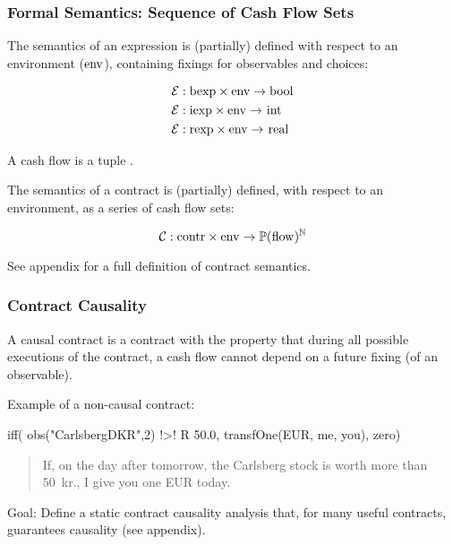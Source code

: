 \documentclass[xcolor=dvipsnames,11pt]{beamer}
\renewcommand{\emph}[1]{\textcolor{structure!90}{#1}}
\newcommand{\ttt}[1]{\mbox{\cd{#1}}}
\begin{document}
\begin{frame}
    \frametitle{Formal Semantics: Sequence of Cash Flow Sets}

The \emph{semantics of an expression} is (partially) defined with
respect to an environment ($\ttt{env}$), containing fixings for
observables and choices:
\vspace*{-2ex}

{\footnotesize
\begin{align*}
  \mathcal{E} & : \ttt{bexp} \times \ttt{env} \rightarrow \ttt{bool}\\
    \mathcal{E} & : \ttt{iexp} \times \ttt{env} \rightarrow \ttt{int}\\
  \mathcal{E} & : \ttt{rexp} \times \ttt{env} \rightarrow \ttt{real}
\end{align*}}
\vspace*{-2ex}

A \emph{cash flow} is a tuple .

\vfill 
The \emph{semantics of a contract} is (partially) defined, with respect
to an environment, as a series of cash flow sets:

$$ \mathcal{C} : \ttt{contr} \times \ttt{env} 
          \rightarrow \mathbb{P}(\ttt{flow})^\mathbb{N}$$

\vfill
See appendix for a full definition of contract semantics.

\end{frame}

\begin{frame}[fragile,t]
    \frametitle{Contract Causality}

 A \emph{causal contract} is a contract with the property that during all
   possible executions of the contract, a cash flow cannot depend on a
   future fixing (of an observable).

\vfill

\emph{Example of a non-causal contract:}

\begin{mlcode}
iff( obs("CarlsbergDKR",2) !>! R 50.0,
                              transfOne(EUR, me, you), zero)
\end{mlcode}
{\footnotesize
\begin{quote}
  If, \emph{on the day after tomorrow}, 
           the Carlsberg stock is worth more than 50~kr.,
           I give you one EUR \emph{today}.
\end{quote}}

\vfill

\emph{Goal}: Define a static contract causality analysis that, for many useful contracts,
guarantees causality (see appendix).
\end{frame}
\end{document}
